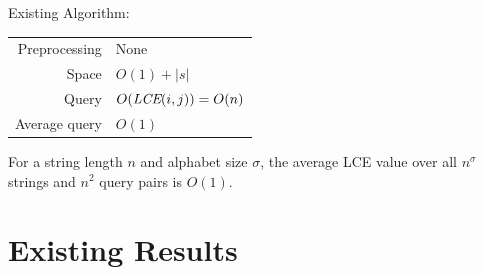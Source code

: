 \documentclass{beamer}
\begin{document}
\begin{frame}{Existing Algorithm: }
    \begin{tabular}{r l}
        Preprocessing & None \\
        Space & $O(1)+|s|$ \\
        Query & $O(\textit{LCE}(i,j))=O(n)$ \\
        Average query & $O(1)$ \\
    \end{tabular}

    \vspace{1cm}
    For a string length $n$ and alphabet size $\sigma$, the average LCE value over all $n^\sigma$ strings and $n^2$ query pairs is $O(1)$.
    \bibs
\end{frame}

\section{Existing Results}
\end{document}
